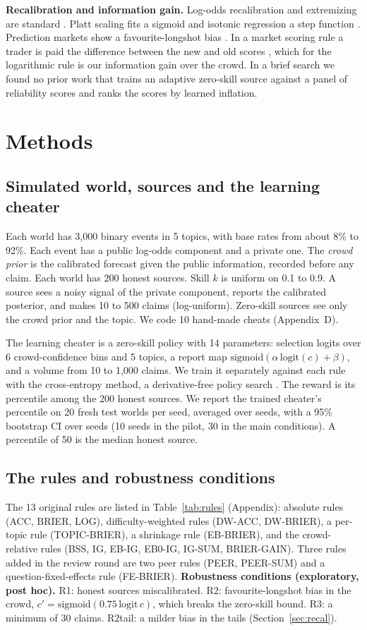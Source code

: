 \documentclass[10pt]{article}
\begin{document}
\textbf{Recalibration and information gain.} Log-odds recalibration and extremizing are standard \citep{turner2014,baron2014,satopaa2014}. Platt scaling fits a sigmoid and isotonic regression a step function \citep{platt1999,zadrozny2002,niculescu2005}. Prediction markets show a favourite-longshot bias \citep{page2013}. In a market scoring rule a trader is paid the difference between the new and old scores \citep{hanson2002}, which for the logarithmic rule is our information gain over the crowd. In a brief search we found no prior work that trains an adaptive zero-skill source against a panel of reliability scores and ranks the scores by learned inflation.

\section{Methods}
\subsection{Simulated world, sources and the learning cheater}
Each world has 3,000 binary events in 5 topics, with base rates from about 8\% to 92\%. Each event has a public log-odds component and a private one. The \emph{crowd prior} is the calibrated forecast given the public information, recorded before any claim. Each world has 200 honest sources. Skill $k$ is uniform on 0.1 to 0.9. A source sees a noisy signal of the private component, reports the calibrated posterior, and makes 10 to 500 claims (log-uniform). Zero-skill sources see only the crowd prior and the topic. We code 10 hand-made cheats (Appendix~D).

The learning cheater is a zero-skill policy with 14 parameters: selection logits over 6 crowd-confidence bins and 5 topics, a report map $\mathrm{sigmoid}(\alpha\,\mathrm{logit}(c)+\beta)$, and a volume from 10 to 1,000 claims. We train it separately against each rule with the cross-entropy method, a derivative-free policy search \citep{rubinstein1999}. The reward is its percentile among the 200 honest sources. We report the trained cheater's percentile on 20 fresh test worlds per seed, averaged over seeds, with a 95\% bootstrap CI over seeds (10 seeds in the pilot, 30 in the main conditions). A percentile of 50 is the median honest source.

\subsection{The rules and robustness conditions}
The 13 original rules are listed in Table~\ref{tab:rules} (Appendix): absolute rules (ACC, BRIER, LOG), difficulty-weighted rules (DW-ACC, DW-BRIER), a per-topic rule (TOPIC-BRIER), a shrinkage rule (EB-BRIER), and the crowd-relative rules (BSS, IG, EB-IG, EB0-IG, IG-SUM, BRIER-GAIN). Three rules added in the review round are two peer rules (PEER, PEER-SUM) and a question-fixed-effects rule (FE-BRIER). \textbf{Robustness conditions (exploratory, post hoc).} R1: honest sources miscalibrated. R2: favourite-longshot bias in the crowd, $c' = \mathrm{sigmoid}(0.75\,\mathrm{logit}\,c)$, which breaks the zero-skill bound. R3: a minimum of 30 claims. R2tail: a milder bias in the tails (Section~\ref{sec:recal}).
\end{document}
